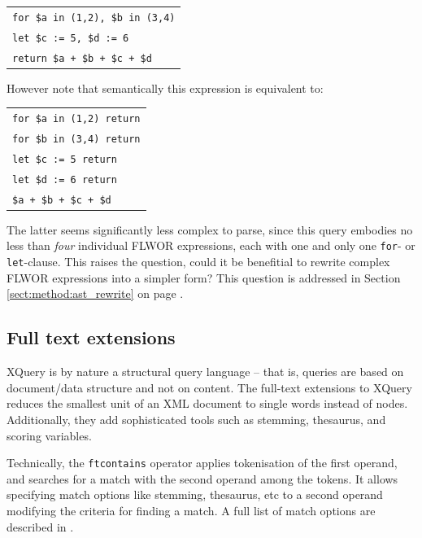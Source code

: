 \begin{center}
\begin{tabular}{l}
\texttt{for \$a in (1,2), \$b in (3,4)} \\
  \texttt{let \$c := 5, \$d := 6} \\ \quad 
  \texttt{return \$a + \$b + \$c + \$d} \\
\end{tabular}
\end{center}

However note that semantically this expression is equivalent to:

\begin{center}
\begin{tabular}{l}
\texttt{for \$a in (1,2) return} \\ \quad
  \texttt{for \$b in (3,4) return} \\ \quad \quad
    \texttt{let \$c := 5 return} \\ \quad \quad \quad 
      \texttt{let \$d := 6 return} \\ \quad \quad \quad \quad 
        \texttt{\$a + \$b + \$c + \$d} \\
\end{tabular}
\end{center}

The latter seems significantly less complex to parse, since this query embodies
no less than \emph{four} individual FLWOR expressions, each with one and only
one \texttt{for}- or \texttt{let}-clause. This raises the question, could it be
benefitial to rewrite complex FLWOR expressions into a simpler form? This
question is addressed in Section \ref{sect:method:ast_rewrite} on page
\pageref{sect:method:ast_rewrite}.

\subsection{Full text extensions}
\label{sect:theory:xquery:fulltext_ext}
XQuery is by nature a structural query language -- that is, queries are based on
document/data structure and not on content. The full-text extensions to XQuery
reduces the smallest unit of an XML document to single words instead of nodes.
Additionally, they add sophisticated tools such as stemming, thesaurus, and
scoring variables.

Technically, the \verb!ftcontains! operator applies tokenisation of the first
operand, and searches for a match with the second operand among the tokens. It
allows specifying match options like stemming, thesaurus, etc to a second
operand modifying the criteria for finding a match. A full list of match
options are described in \cite{w3c01}.

